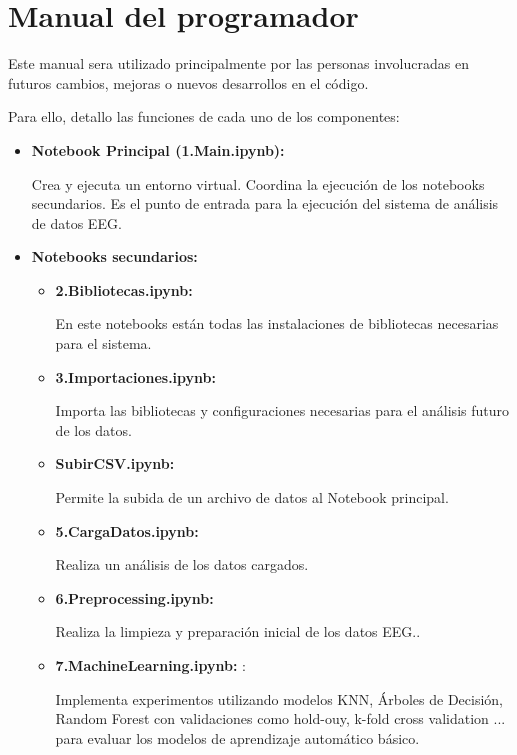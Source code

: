   
  

\section{Manual del programador}

Este manual sera utilizado principalmente por las personas involucradas en futuros cambios, mejoras o nuevos desarrollos en el código.

Para ello, detallo las funciones de cada uno de los componentes:

  \begin{itemize}
  \tightlist
  \item
   \textbf{Notebook Principal (1.Main.ipynb):}
   
   Crea y ejecuta un entorno virtual. Coordina la ejecución de los notebooks secundarios. Es el punto de entrada para la ejecución del sistema de análisis de datos EEG.
  \item
   \textbf{Notebooks secundarios:}
   \begin{itemize}
   \tightlist
   \item
    \textbf{2.Bibliotecas.ipynb:} 
    
    En este notebooks están todas las instalaciones de bibliotecas necesarias para el sistema.
    
   \item
    \textbf{3.Importaciones.ipynb:} 
   
    Importa las bibliotecas y configuraciones necesarias para el análisis futuro de los datos.
    
   \item
    \textbf{SubirCSV.ipynb:} 
   
    Permite la subida de un archivo de datos al Notebook principal.
    
   \item
    \textbf{5.CargaDatos.ipynb:} 
   
    Realiza un análisis de los datos cargados.
    
   \item
    \textbf{6.Preprocessing.ipynb:} 
   
    Realiza la limpieza y preparación inicial de los datos EEG..
    
   \item
    \textbf{7.MachineLearning.ipynb:} : 
    
    Implementa experimentos utilizando modelos KNN, Árboles de Decisión, Random Forest con validaciones como hold-ouy, k-fold cross validation ... para evaluar los modelos de aprendizaje automático básico.
    

\end{itemize}
\end{itemize}
